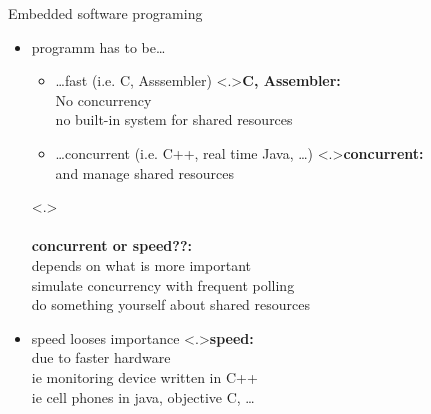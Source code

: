 \documentclass[ngerman={babel}, utf8, bigger, t, xcolor={table,dvipsnames}, ompress, hyperref={bookmarks,colorlinks}]{beamer}
\begin{document}
\begin{frame}{Embedded software programing}
	\begin{itemize}
		\item programm has to be\dots
			\begin{itemize}
				\item \dots fast (i.e. C, Asssembler)
				\note<.>{\textbf{C, Assembler:}\\ No concurrency \\ no built-in system for shared resources}
				\item \dots concurrent (i.e. C++, real time Java, \dots){}
				\note<.>{\textbf{concurrent:}\\ and manage shared resources}
			\end{itemize}
			\note<.>{\\ \ \\ \textbf{concurrent or speed??:}\\ depends on what is more important \\ simulate concurrency with frequent polling \\ do something yourself about shared resources}
			\item speed looses importance
			\note<.>{\textbf{speed:}\\ due to faster hardware \\ ie monitoring device written in C++ \\ ie cell phones in java, objective C, \dots}
	\end{itemize}
\end{frame}
\end{document}
